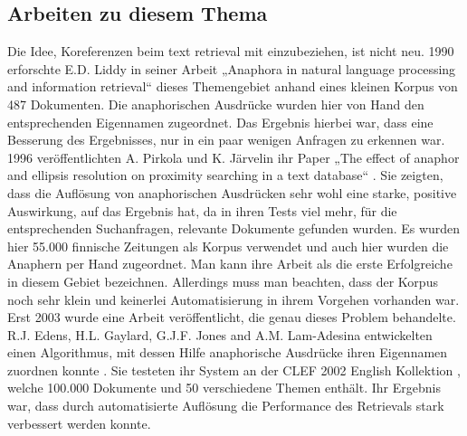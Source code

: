 \subsection{Arbeiten zu diesem Thema}

Die Idee, Koreferenzen beim text retrieval mit einzubeziehen, ist nicht neu. 1990 erforschte E.D. Liddy in seiner Arbeit „Anaphora in natural language processing and information retrieval“ \cite{paper:Liddy} dieses Themengebiet anhand eines kleinen Korpus von 487 Dokumenten. Die anaphorischen Ausdrücke wurden hier von Hand den entsprechenden Eigennamen zugeordnet. Das Ergebnis hierbei war, dass eine Besserung des Ergebnisses, nur in ein paar wenigen Anfragen zu erkennen war.\\
1996 veröffentlichten A. Pirkola und K. Järvelin ihr Paper „The effect of anaphor and ellipsis resolution on proximity searching in a text database“ \cite{paper:Pirkola}. Sie zeigten, dass die Auflösung von anaphorischen Ausdrücken sehr wohl eine starke, positive Auswirkung, auf das Ergebnis hat, da in ihren Tests viel mehr, für die entsprechenden Suchanfragen, relevante Dokumente gefunden wurden. Es wurden hier 55.000 finnische Zeitungen als Korpus verwendet und auch hier wurden die Anaphern per Hand zugeordnet. Man kann ihre Arbeit als die erste Erfolgreiche in diesem Gebiet bezeichnen. Allerdings muss man beachten, dass der Korpus noch sehr klein und keinerlei Automatisierung in ihrem Vorgehen vorhanden war.\\
Erst 2003 wurde eine Arbeit veröffentlicht, die genau dieses Problem behandelte. R.J. Edens, H.L. Gaylard, G.J.F. Jones and A.M. Lam-Adesina entwickelten einen Algorithmus, mit dessen Hilfe anaphorische Ausdrücke ihren Eigennamen zuordnen konnte \cite{paper:Edens}. Sie testeten ihr System an der CLEF 2002 English Kollektion \cite{paper:Braschler}, welche 100.000 Dokumente und 50 verschiedene Themen enthält. Ihr Ergebnis war, dass durch automatisierte Auflösung die Performance des Retrievals stark verbessert werden konnte.
